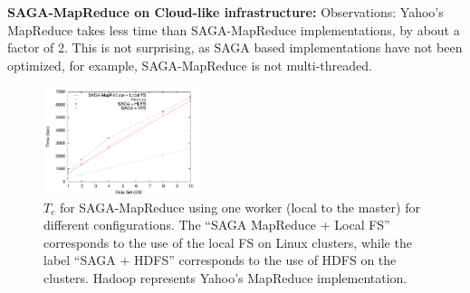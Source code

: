\documentclass[conference,final]{IEEEtran}
\newcommand{\sagamapreduce }{SAGA-MapReduce }
\newcommand{\tc }{ $T_c$ }
\begin{document}




{\bf SAGA-MapReduce on Cloud-like infrastructure: } Observations:
Yahoo's MapReduce takes less time than \sagamapreduce implementations,
by about a factor of 2. This is not surprising, as SAGA based
implementations have not been optimized, for example, \sagamapreduce
is not multi-threaded.
\begin{figure}[t]
      \centering
          \includegraphics[width=0.40\textwidth]{mapreduce_timing_FS.pdf}
          \caption{\tc for \sagamapreduce using one worker (local to
            the master) for different configurations.  The ``SAGA
            MapReduce + Local FS'' corresponds to the use of the local
            FS on Linux clusters, while the label ``SAGA + HDFS''
            corresponds to the use of HDFS on the clusters. 
            Hadoop represents Yahoo's MapReduce implementation.}
      \label{saga_mapreduce_1worker.png}
\end{figure}
\end{document}
